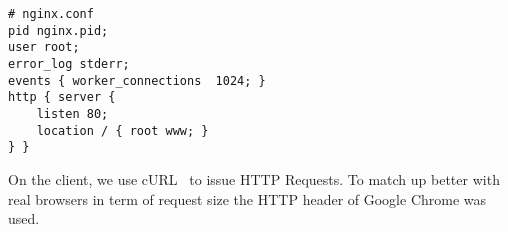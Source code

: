 \begin{lstlisting}
# nginx.conf
pid nginx.pid;
user root;
error_log stderr;
events { worker_connections  1024; }
http { server {
    listen 80;
    location / { root www; }
} }
\end{lstlisting}

On the client, we use cURL~\cite{curl} to issue HTTP Requests. To match up
better with real browsers in term of request size the HTTP header of Google
Chrome was used.

%
%
%
